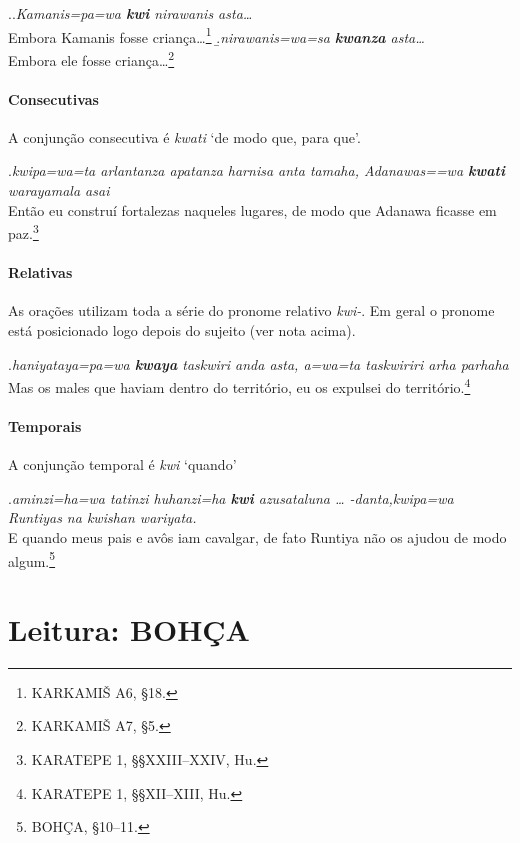 \ex.\a.\emph{Kamanis=pa=wa \textbf{kwi} nirawanis asta\ldots{}}\\
Embora Kamanis fosse criança\ldots{}\footnote{KARKAMIŠ A6, §18.}
\b.\emph{nirawanis=wa=sa \textbf{kwanza} asta\ldots{}}\\
Embora ele fosse criança\ldots{}\footnote{KARKAMIŠ A7, §5.}


\paragraph{Consecutivas}
A conjunção consecutiva é \emph{kwati} `de modo que, para que'.

\ex.\emph{kwipa=wa=ta arlantanza apatanza harnisa anta tamaha,
	Adanawas=\linebreak=wa
	\textbf{kwa\-ti} warayamala asai}\\
Então eu construí fortalezas naqueles lugares, de modo que Adanawa\linebreak
ficasse em paz.\footnote{KARATEPE 1, §§XXIII--XXIV, Hu.}

\paragraph{Relativas}
As orações utilizam toda a série do pronome relativo \emph{kwi-}.
Em geral o pronome está posicionado logo depois do sujeito (ver nota acima).

\ex.\emph{haniyataya=pa=wa \textbf{kwaya} taskwiri anda asta, a=wa=ta
	taskwiriri arha par\-haha}\\
Mas os males que haviam dentro do território, eu os expulsei do
território.\footnote{KARATEPE 1, §§XII--XIII, Hu.}

\paragraph{Temporais}
A conjunção temporal é \emph{kwi} `quando'

\ex.\emph{aminzi=ha=wa tatinzi huhanzi=ha \textbf{kwi} azusataluna {\ldots}
	-danta,\linebreak kwipa=wa Runtiyas na
	kwishan wariyata.}\\
E quando meus pais e avôs iam cavalgar, de fato Runtiya não
os ajudou de modo algum.\footnote{BOHÇA, §10--11.}




\section{Leitura: BOHÇA}


